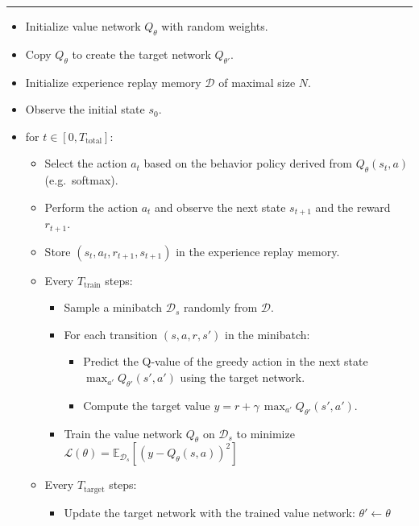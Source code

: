 \documentclass[
  letterpaper,
  DIV=11,
  numbers=noendperiod]{scrreprt}
\providecommand{\tightlist}{%
  \setlength{\itemsep}{0pt}\setlength{\parskip}{0pt}}\usepackage{longtable,booktabs,array}
\begin{document}
\begin{center}\rule{0.5\linewidth}{0.5pt}\end{center}

\begin{itemize}
\tightlist
\item
  Initialize value network \(Q_{\theta}\) with random weights.
\item
  Copy \(Q_{\theta}\) to create the target network \(Q_{\theta'}\).
\item
  Initialize experience replay memory \(\mathcal{D}\) of maximal size
  \(N\).
\item
  Observe the initial state \(s_0\).
\item
  for \(t \in [0, T_\text{total}]\):

  \begin{itemize}
  \tightlist
  \item
    Select the action \(a_t\) based on the behavior policy derived from
    \(Q_\theta(s_t, a)\) (e.g.~softmax).
  \item
    Perform the action \(a_t\) and observe the next state \(s_{t+1}\)
    and the reward \(r_{t+1}\).
  \item
    Store \((s_t, a_t, r_{t+1}, s_{t+1})\) in the experience replay
    memory.
  \item
    Every \(T_\text{train}\) steps:

    \begin{itemize}
    \tightlist
    \item
      Sample a minibatch \(\mathcal{D}_s\) randomly from
      \(\mathcal{D}\).
    \item
      For each transition \((s, a, r, s')\) in the minibatch:

      \begin{itemize}
      \tightlist
      \item
        Predict the Q-value of the greedy action in the next state
        \(\max_{a'} Q_{\theta'}(s', a')\) using the target network.
      \item
        Compute the target value
        \(y = r + \gamma \, \max_{a'} Q_{\theta'}(s', a')\).
      \end{itemize}
    \item
      Train the value network \(Q_{\theta}\) on \(\mathcal{D}_s\) to
      minimize
      \(\mathcal{L}(\theta) = \mathbb{E}_{\mathcal{D}_s}[(y - Q_\theta(s, a))^2]\)
    \end{itemize}
  \item
    Every \(T_\text{target}\) steps:

    \begin{itemize}
    \tightlist
    \item
      Update the target network with the trained value network:
      \(\theta' \leftarrow \theta\)
    \end{itemize}
  \end{itemize}
\end{itemize}
\end{document}
